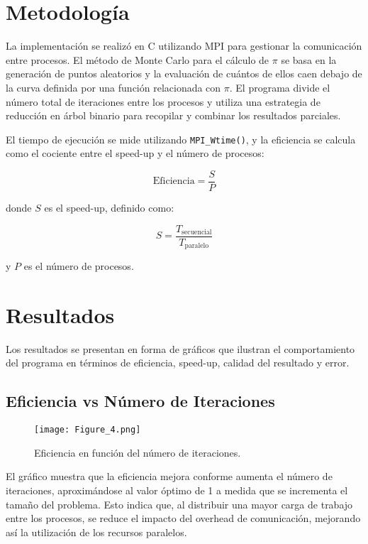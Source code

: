 \documentclass[conference, a4paper]{IEEEtran}
\begin{document}
\section{Metodología}
La implementación se realizó en C utilizando MPI para gestionar la comunicación entre procesos. El método de Monte Carlo para el cálculo de \(\pi\) se basa en la generación de puntos aleatorios y la evaluación de cuántos de ellos caen debajo de la curva definida por una función relacionada con \(\pi\). El programa divide el número total de iteraciones entre los procesos y utiliza una estrategia de reducción en árbol binario para recopilar y combinar los resultados parciales.

El tiempo de ejecución se mide utilizando \texttt{MPI\_Wtime()}, y la eficiencia se calcula como el cociente entre el speed-up y el número de procesos:

\begin{equation}
\text{Eficiencia} = \frac{S}{P}
\end{equation}

donde \( S \) es el speed-up, definido como:

\begin{equation}
S = \frac{T_{\text{secuencial}}}{T_{\text{paralelo}}}
\end{equation}

y \( P \) es el número de procesos.

\section{Resultados}
Los resultados se presentan en forma de gráficos que ilustran el comportamiento del programa en términos de eficiencia, speed-up, calidad del resultado y error.

\subsection{Eficiencia vs Número de Iteraciones}
\begin{figure}[H]
    \centering
    \texttt{[image: Figure\_4.png]}
    \caption{Eficiencia en función del número de iteraciones.}
    \label{fig:eficiencia}
\end{figure}

El gráfico muestra que la eficiencia mejora conforme aumenta el número de iteraciones, aproximándose al valor óptimo de 1 a medida que se incrementa el tamaño del problema. Esto indica que, al distribuir una mayor carga de trabajo entre los procesos, se reduce el impacto del overhead de comunicación, mejorando así la utilización de los recursos paralelos.
\end{document}
